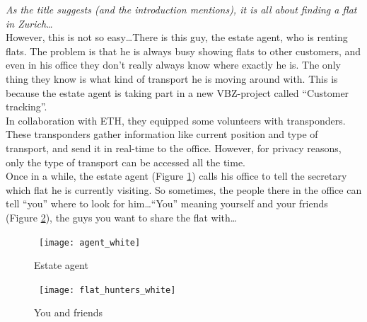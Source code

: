 \emph{As the title suggests (and the introduction mentions), it is all about finding a flat in Zurich\ldots}\\

However, this is not so easy\ldots There is this guy, the estate agent, who is renting flats. The problem is that he is always busy showing flats to other customers, and even in his office they don't really always know where exactly he is. The only thing they know is what kind of transport he is moving around with. This is because the estate agent is taking part in a new VBZ-project called ``Customer tracking''.\\

In collaboration with ETH, they equipped some volunteers with transponders. These transponders gather information like current position and type of transport, and send it in real-time to the office. However, for privacy reasons, only the type of transport can be accessed all the time.\\

Once in a while, the estate agent (Figure \ref{agent}) calls his office to tell the secretary which flat he is currently visiting. So sometimes, the people there in the office can tell ``you'' where to look for him\ldots ``You'' meaning yourself and your friends (Figure \ref{hunters}), the guys you want to share the flat with\ldots

\begin{figure}[h]
\centerline{\hbox{  
  \texttt{[image: agent\_white]}
  }}
\caption{Estate agent}
\label{agent}
\end{figure}

\begin{figure}[h]
  \centerline{\hbox{
    \texttt{[image: flat\_hunters\_white]}
  }}
\caption{You and friends}
\label{hunters}
\end{figure}
